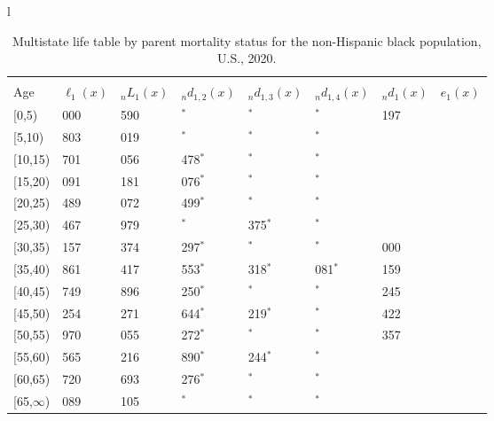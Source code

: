 \documentclass[
]{article}
\begin{document}
\begin{table}
\caption{\label{tab:table-nhblack}Multistate life table by parent mortality status for the non-Hispanic black population, U.S., 2020.}

\centering
\fontsize{9}{11}\selectfont
\begin{tabular}[t]{l}
\hline
\begin{tabular}{>{\raggedright\arraybackslash}p{.45in}>{\raggedleft\arraybackslash}p{.65in}>{\raggedleft\arraybackslash}p{.65in}>{\raggedleft\arraybackslash}p{.65in}>{\raggedleft\arraybackslash}p{.65in}>{\raggedleft\arraybackslash}p{.65in}>{\raggedleft\arraybackslash}p{.65in}>{\raggedleft\arraybackslash}p{.65in}}
\toprule
\multicolumn{1}{c}{ } & \multicolumn{7}{c}{(1) Lost neither} \\
\cmidrule(l{3pt}r{3pt}){2-8}
Age & $\ell_{1}(x)$ & ${}_nL_{1}(x)$ & ${}_nd_{1,2}(x)$ & ${}_nd_{1,3}(x)$ & ${}_nd_{1,4}(x)$ & ${}_nd_{1}(x)$ & $e_{1}(x)$\\
\midrule
{}[0,5) & 100 000 & 490 590 & 0$^{*}$ & 0$^{*}$ & 0$^{*}$ & 1 197 & 41\\
{}[5,10) & 98 803 & 485 019 & 0$^{*}$ & 0$^{*}$ & 0$^{*}$ & 103 & 37\\
{}[10,15) & 98 701 & 468 056 & 1 478$^{*}$ & 0$^{*}$ & 0$^{*}$ & 131 & 32\\
{}[15,20) & 97 091 & 445 181 & 2 076$^{*}$ & 0$^{*}$ & 0$^{*}$ & 526 & 27\\
{}[20,25) & 94 489 & 443 072 & 1 499$^{*}$ & 584$^{*}$ & 0$^{*}$ & 940 & 23\\
\addlinespace
{}[25,30) & 91 467 & 405 979 & 0$^{*}$ & 1 375$^{*}$ & 0$^{*}$ & 934 & 19\\
{}[30,35) & 89 157 & 352 374 & 8 297$^{*}$ & 0$^{*}$ & 0$^{*}$ & 1 000 & 15\\
{}[35,40) & 79 861 & 323 417 & 14 553$^{*}$ & 3 318$^{*}$ & 1 081$^{*}$ & 1 159 & 11\\
{}[40,45) & 59 749 & 266 896 & 7 250$^{*}$ & 0$^{*}$ & 0$^{*}$ & 1 245 & 8\\
{}[45,50) & 51 254 & 226 271 & 3 644$^{*}$ & 6 219$^{*}$ & 0$^{*}$ & 1 422 & 5\\
\addlinespace
{}[50,55) & 39 970 & 152 055 & 6 272$^{*}$ & 777$^{*}$ & 0$^{*}$ & 1 357 & 3\\
{}[55,60) & 31 565 & 53 216 & 6 890$^{*}$ & 1 244$^{*}$ & 0$^{*}$ & 711 & 1\\
{}[60,65) & 22 720 & 19 693 & 1 276$^{*}$ & 963$^{*}$ & 0$^{*}$ & 392 & 0\\
{}[65,$\infty$) & 20 089 & 11 105 & 0$^{*}$ & 0$^{*}$ & 0$^{*}$ & 686 & 0\\

\end{tabular}
\end{tabular}
\end{table}
\end{document}
